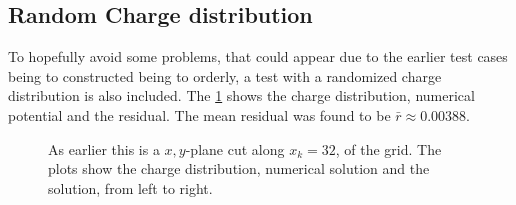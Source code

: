 		\subsection{Random Charge distribution}
			To hopefully avoid some problems, that could appear due to the earlier test
			cases being to constructed being to orderly, a test with a randomized
			charge distribution is also included. The \cref{fig:random} shows the
			charge distribution, numerical potential and the residual. The mean residual was
 			found to be \(\bar{r} \approx 0.00388\).
			\begin{figure}
				\centering
				\caption{As earlier this is a \(x,y\)-plane cut along \(x_k=32\), of the grid. The plots show the charge distribution,
				numerical solution and the solution, from left to right.}
				\label{fig:random}
			\end{figure}
%
%
%
%


